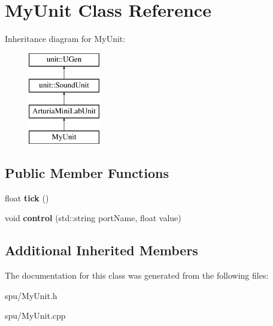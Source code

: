 \hypertarget{classMyUnit}{}\section{My\+Unit Class Reference}
\label{classMyUnit}
Inheritance diagram for My\+Unit\+:\begin{figure}[H]
\begin{center}
\leavevmode
\includegraphics[height=4.000000cm]{classMyUnit}
\end{center}
\end{figure}
\subsection*{Public Member Functions}
\begin{DoxyCompactItemize}
\item 
float {\bfseries tick} ()\hypertarget{classMyUnit_a953579dd3e7fd08821f52c957227b6dc}{}\label{classMyUnit_a953579dd3e7fd08821f52c957227b6dc}

\item 
void {\bfseries control} (std\+::string port\+Name, float value)\hypertarget{classMyUnit_a6124b88dea5a34a74748553757de4357}{}\label{classMyUnit_a6124b88dea5a34a74748553757de4357}

\end{DoxyCompactItemize}
\subsection*{Additional Inherited Members}


The documentation for this class was generated from the following files\+:\begin{DoxyCompactItemize}
\item 
spu/My\+Unit.\+h\item 
spu/My\+Unit.\+cpp\end{DoxyCompactItemize}
